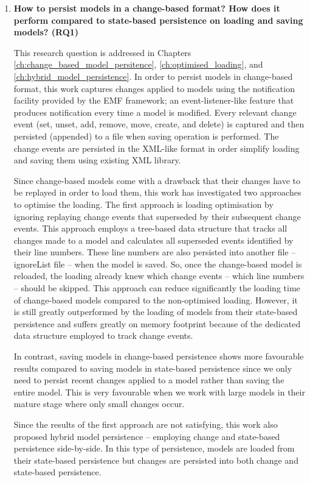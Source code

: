 \begin{enumerate} 
  \item \textbf{How to persist models in a change-based format? How does it perform compared to state-based persistence on loading and saving models? (RQ1)} 
  
  This research question is addressed in Chapters \ref{ch:change_based_model_persitence}, \ref{ch:optimised_loading}, and \ref{ch:hybrid_model_persistence}. In order to persist models in change-based format, this work captures changes applied to models using the notification facility provided by the EMF framework; an event-listener-like feature that produces notification every time a model is modified. Every relevant change event (set, unset, add, remove, move, create, and delete) is captured and then persisted (appended) to a file when saving operation is performed. The change events are persisted in the XML-like format in order simplify loading and saving them using existing XML library. 
  
  Since change-based models come with a drawback that their changes have to be replayed in order to load them, this work has investigated two approaches to optimise the loading. The first approach is loading optimisation by ignoring replaying change events that superseded by their subsequent change events. This approach employs a tree-based data structure that tracks all changes made to a model and calculates all superseded events identified by their line numbers. These line numbers are also persisted into another file -- \textsf{ignoreList} file -- when the model is saved. So, once the change-based model is reloaded, the loading already knew which change events -- which line numbers -- should be skipped. This approach can reduce significantly the loading time of change-based models compared to the non-optimised loading. However, it is still greatly outperformed by the loading of models from their state-based persistence and suffers greatly on memory footprint because of the dedicated data structure employed to track change events. 
  
  In contrast, saving models in change-based persistence shows more favourable results compared to saving models in state-based persistence since we only need to persist recent changes applied to a model rather than saving the entire model. This is very favourable when we work with large models in their mature stage where only small changes occur. 
  
  Since the results of the first approach are not satisfying, this work also proposed hybrid model persistence -- employing change and state-based persistence side-by-side. In this type of persistence, models are loaded from their state-based persistence but changes are persisted into both change and state-based persistence.  
  

\end{enumerate}
